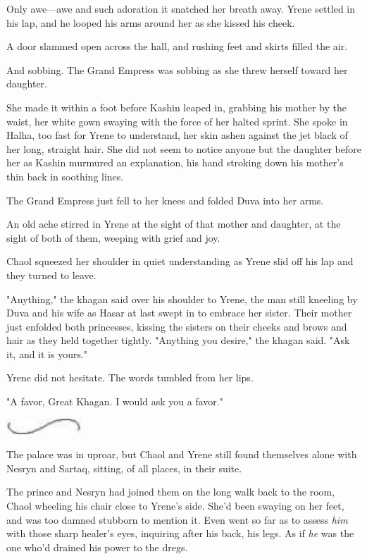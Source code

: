Only awe---awe and such adoration it snatched her breath away.
Yrene settled in his lap, and he looped his arms around her as she kissed his cheek.

A door slammed open across the hall, and rushing feet and skirts filled the air.

And sobbing.
The Grand Empress was sobbing as she threw herself toward her daughter.

She made it within a foot before Kashin leaped in, grabbing his mother by the waist, her white gown swaying with the force of her halted sprint.
She spoke in Halha, too fast for Yrene to understand, her skin ashen against the jet black of her long, straight hair.
She did not seem to notice anyone but the daughter before her as Kashin murmured an explanation, his hand stroking down his mother's thin back in soothing lines.

The Grand Empress just fell to her knees and folded Duva into her arms.

An old ache stirred in Yrene at the sight of that mother and daughter, at the sight of both of them, weeping with grief and joy.

Chaol squeezed her shoulder in quiet understanding as Yrene slid off his lap and they turned to leave.

"Anything," the khagan said over his shoulder to Yrene, the man still kneeling by Duva and his wife as Hasar at last swept in to embrace her sister.
Their mother just enfolded both princesses, kissing the sisters on their cheeks and brows and hair as they held together tightly.
"Anything you desire," the khagan said.
"Ask it, and it is yours."

Yrene did not hesitate.
The words tumbled from her lips.

"A favor, Great Khagan.
I would ask you a favor."

\begin{center}
	\includegraphics[width=1.12in,height=0.24in]{images/seperator}
\end{center}

The palace was in uproar, but Chaol and Yrene still found themselves alone with Nesryn and Sartaq, sitting, of all places, in their suite.

The prince and Nesryn had joined them on the long walk back to the room, Chaol wheeling his chair close to Yrene's side.
She'd been swaying on her feet, and was too damned stubborn to mention it.
Even went so far as to assess \emph{him} with those sharp healer's eyes, inquiring after his back, his legs.
As if \emph{he} was the one who'd drained his power to the dregs.

